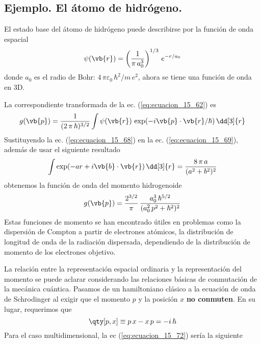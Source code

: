 \subsection*{Ejemplo. El átomo de hidrógeno.}
El estado base del átomo de hidrógeno puede describirse por la función de onda espacial
\begin{equation}
\psi (\vb{r}) = \left( \dfrac{1}{\pi \, a_{0}^{3}} \right)^{1/3} \, e^{-r/a_{0}}
\label{eq:ecuacion_15_68}
\end{equation}
donde $a_{0}$ es el radio de Bohr: $4 \, \pi \varepsilon_{0} \, \hbar^{2} / m \, e^{2}$, ahora se tiene una función de onda en 3D.
\par
La correspondiente transformada de la ec. (\ref{eq:ecuacion_15_62}) es
\begin{equation}
g (\vb{p}) = \dfrac{1}{(2 \, \pi \, \hbar)^{3/2}} \int \psi (\vb{r}) \, \exp(-i \vb{p} \cdot \vb{r} / \hbar) \, \dd[3]{r}
\label{eq:ecuacion_15_69}
\end{equation}
Sustituyendo la ec. (\ref{eq:ecuacion_15_68}) en la ec. (\ref{eq:ecuacion_15_69}), además de usar el siguiente resultado
\begin{equation}
\int \exp(-a r + i \vb{b} \cdot \vb{r}) \, \dd[3]{r} = \dfrac{8 \, \pi \, a}{(a^{2} + b^{2})^{2}}
\label{eq:ecuacion_15_70}
\end{equation}
obtenemos la función de onda del momento hidrogenoide
\begin{equation}
g (\vb{p}) = \dfrac{2^{3/2}}{\pi} \, \dfrac{a_{0}^{3} \, \hbar^{5/2}}{(a_{0}^{2} \, p^{2} + \hbar^{2})^{2}}
\label{eq:ecuacion_15_71}
\end{equation}
Estas funciones de momento se han encontrado útiles en problemas como la dispersión de Compton a partir de electrones atómicos, la distribución de longitud de onda de la radiación dispersada, dependiendo de la distribución de momento de los electrones objetivo.
\par
La relación entre la representación espacial ordinaria y la representación del momento se puede aclarar considerando las relaciones básicas de conmutación de la mecánica cuántica. Pasamos de un hamiltoniano clásico a la ecuación de onda de Schrodinger al exigir que el momento $p$ y la posición $x$ \textbf{no conmuten}. En su lugar, requerimos que
\begin{equation}
\qty[p, x] \equiv p \, x - x \, p = - i \, \hbar
\label{eq:ecuacion_15_72}
\end{equation}
Para el caso multidimensional, la ec (\ref{eq:ecuacion_15_72}) sería la siguiente
